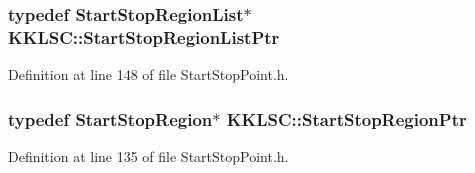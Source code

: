 \subsubsection[{\texorpdfstring{Start\+Stop\+Region\+List\+Ptr}{StartStopRegionListPtr}}]{\setlength{\rightskip}{0pt plus 5cm}typedef {\bf Start\+Stop\+Region\+List}$\ast$ {\bf K\+K\+L\+S\+C\+::\+Start\+Stop\+Region\+List\+Ptr}}\hypertarget{namespace_k_k_l_s_c_a3ed8c41747a01b144f71fafbc42f2b19}{}\label{namespace_k_k_l_s_c_a3ed8c41747a01b144f71fafbc42f2b19}


Definition at line 148 of file Start\+Stop\+Point.\+h.

\subsubsection[{\texorpdfstring{Start\+Stop\+Region\+Ptr}{StartStopRegionPtr}}]{\setlength{\rightskip}{0pt plus 5cm}typedef {\bf Start\+Stop\+Region}$\ast$ {\bf K\+K\+L\+S\+C\+::\+Start\+Stop\+Region\+Ptr}}\hypertarget{namespace_k_k_l_s_c_ab8d461b98323a176ed761955cd9547c0}{}\label{namespace_k_k_l_s_c_ab8d461b98323a176ed761955cd9547c0}


Definition at line 135 of file Start\+Stop\+Point.\+h.

